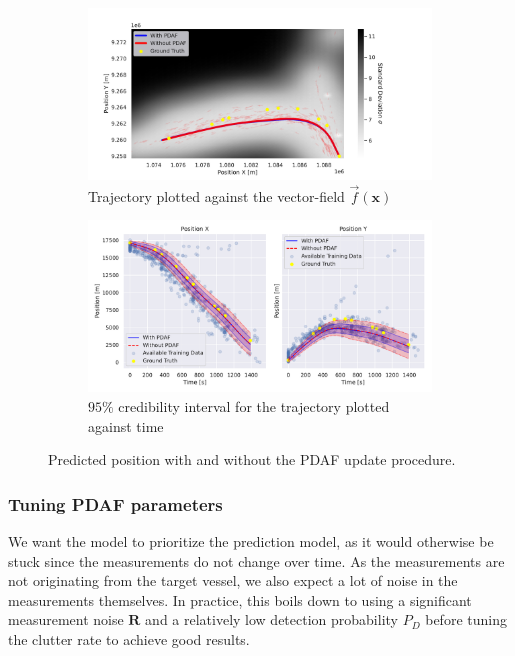 \begin{figure}
    \centering
    \begin{subfigure}{\textwidth}
    \centering
    \includegraphics[width=\textwidth]{figures/dyngp/gp_ekf_with_pdaf.pdf}
    \caption{Trajectory plotted against the vector-field $\vec{f}(\boldsymbol{x})$}
    \end{subfigure}
    \begin{subfigure}{\textwidth}
    \centering
    \includegraphics[width=\textwidth]{figures/dyngp/gp_ekf_unc_with_pdaf.pdf}
    \caption{$95\%$ credibility interval for the trajectory plotted against time}
    \end{subfigure}
    \caption{Predicted position with and without the PDAF update procedure.}
    \label{fig:gp_ekf_with_pdaf}
\end{figure}

\subsubsection{Tuning PDAF parameters}
We want the model to prioritize the prediction model, as it would otherwise be stuck since the measurements do not change over time. As the measurements are not originating from the target vessel, we also expect a lot of noise in the measurements themselves. In practice, this boils down to using a significant measurement noise $\boldsymbol{R}$ and a relatively low detection probability $P_D$ before tuning the clutter rate to achieve good results. 
